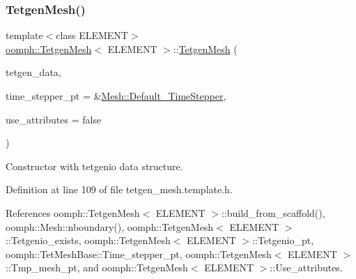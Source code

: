 \subsubsection{\texorpdfstring{Tetgen\+Mesh()}{TetgenMesh()}\hspace{0.1cm}{\footnotesize\ttfamily [3/6]}}
{\footnotesize\ttfamily template$<$class E\+L\+E\+M\+E\+NT$>$ \\
\hyperlink{classoomph_1_1TetgenMesh}{oomph\+::\+Tetgen\+Mesh}$<$ E\+L\+E\+M\+E\+NT $>$\+::\hyperlink{classoomph_1_1TetgenMesh}{Tetgen\+Mesh} (\begin{DoxyParamCaption}\item[{tetgenio \&}]{tetgen\+\_\+data,  }\item[{\hyperlink{classoomph_1_1TimeStepper}{Time\+Stepper} $\ast$}]{time\+\_\+stepper\+\_\+pt = {\ttfamily \&\hyperlink{classoomph_1_1Mesh_a12243d0fee2b1fcee729ee5a4777ea10}{Mesh\+::\+Default\+\_\+\+Time\+Stepper}},  }\item[{const bool \&}]{use\+\_\+attributes = {\ttfamily false} }\end{DoxyParamCaption})\hspace{0.3cm}{\ttfamily [inline]}}



Constructor with tetgenio data structure. 



Definition at line 109 of file tetgen\+\_\+mesh.\+template.\+h.



References oomph\+::\+Tetgen\+Mesh$<$ E\+L\+E\+M\+E\+N\+T $>$\+::build\+\_\+from\+\_\+scaffold(), oomph\+::\+Mesh\+::nboundary(), oomph\+::\+Tetgen\+Mesh$<$ E\+L\+E\+M\+E\+N\+T $>$\+::\+Tetgenio\+\_\+exists, oomph\+::\+Tetgen\+Mesh$<$ E\+L\+E\+M\+E\+N\+T $>$\+::\+Tetgenio\+\_\+pt, oomph\+::\+Tet\+Mesh\+Base\+::\+Time\+\_\+stepper\+\_\+pt, oomph\+::\+Tetgen\+Mesh$<$ E\+L\+E\+M\+E\+N\+T $>$\+::\+Tmp\+\_\+mesh\+\_\+pt, and oomph\+::\+Tetgen\+Mesh$<$ E\+L\+E\+M\+E\+N\+T $>$\+::\+Use\+\_\+attributes.

\mbox{\label{classoomph_1_1TetgenMesh_a867b3f70bd0f5063901720d04f28e95e}} 
